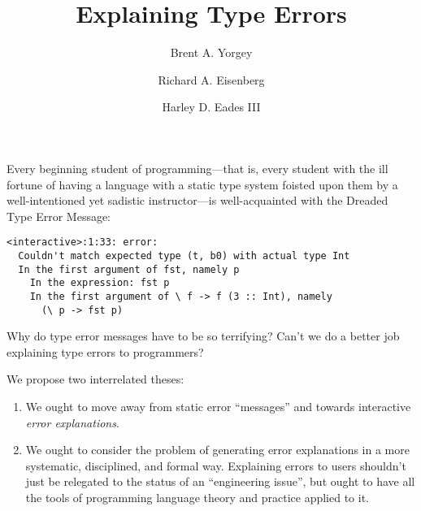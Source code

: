 \documentclass[sigplan, screen]{acmart}\settopmatter{printccs=false,printacmref=false}
\begin{document}
\title{Explaining Type Errors}

\author{Brent A. Yorgey}

\author{Richard A. Eisenberg}

\author{Harley D. Eades III}



\maketitle

Every beginning student of programming---that is, every student with
the ill fortune of having a language with a static type system foisted
upon them by a well-intentioned yet sadistic instructor---is
well-acquainted with the Dreaded Type Error Message:

\begin{verbatim}
<interactive>:1:33: error:
  Couldn't match expected type (t, b0) with actual type Int
  In the first argument of fst, namely p
    In the expression: fst p
    In the first argument of \ f -> f (3 :: Int), namely
      (\ p -> fst p)
\end{verbatim}

Why do type error messages have to be so terrifying?  Can't we do a
better job explaining type errors to programmers?

We propose two interrelated theses:
\begin{enumerate}
\item We ought to move away from static error ``messages'' and towards
  interactive \emph{error explanations}.
\item We ought to consider the problem of generating error
  explanations in a more systematic, disciplined, and formal way.
  Explaining errors to users shouldn't just be relegated to the status
  of an ``engineering issue'', but ought to have all the tools of
  programming language theory and practice applied to it.
\end{enumerate}
\end{document}
